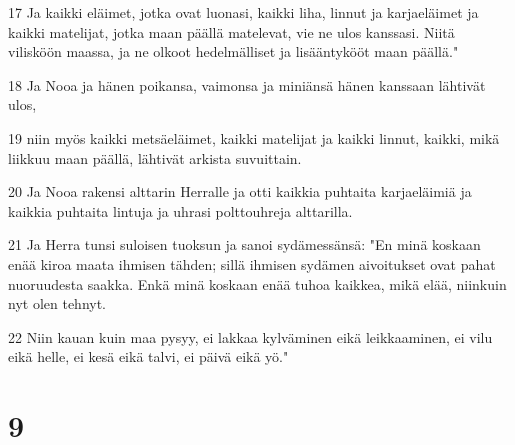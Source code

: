 \par 17 Ja kaikki eläimet, jotka ovat luonasi, kaikki liha, linnut ja karjaeläimet ja kaikki matelijat, jotka maan päällä matelevat, vie ne ulos kanssasi. Niitä vilisköön maassa, ja ne olkoot hedelmälliset ja lisääntykööt maan päällä."
\par 18 Ja Nooa ja hänen poikansa, vaimonsa ja miniänsä hänen kanssaan lähtivät ulos,
\par 19 niin myös kaikki metsäeläimet, kaikki matelijat ja kaikki linnut, kaikki, mikä liikkuu maan päällä, lähtivät arkista suvuittain.
\par 20 Ja Nooa rakensi alttarin Herralle ja otti kaikkia puhtaita karjaeläimiä ja kaikkia puhtaita lintuja ja uhrasi polttouhreja alttarilla.
\par 21 Ja Herra tunsi suloisen tuoksun ja sanoi sydämessänsä: "En minä koskaan enää kiroa maata ihmisen tähden; sillä ihmisen sydämen aivoitukset ovat pahat nuoruudesta saakka. Enkä minä koskaan enää tuhoa kaikkea, mikä elää, niinkuin nyt olen tehnyt.
\par 22 Niin kauan kuin maa pysyy, ei lakkaa kylväminen eikä leikkaaminen, ei vilu eikä helle, ei kesä eikä talvi, ei päivä eikä yö."

\chapter{9}

